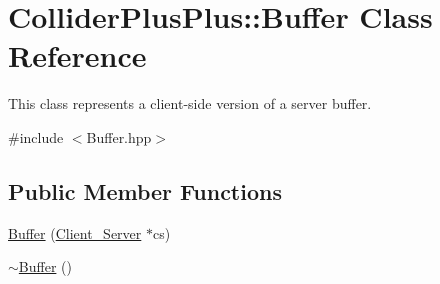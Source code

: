 \hypertarget{classColliderPlusPlus_1_1Buffer}{\section{Collider\-Plus\-Plus\-:\-:Buffer Class Reference}
\label{classColliderPlusPlus_1_1Buffer}
}


This class represents a client-\/side version of a server buffer.  




{\ttfamily \#include $<$Buffer.\-hpp$>$}

\subsection*{Public Member Functions}
\begin{DoxyCompactItemize}
\item 
\hyperlink{classColliderPlusPlus_1_1Buffer_a0455de2dafbd2882de067556f7e1497d}{Buffer} (\hyperlink{classColliderPlusPlus_1_1Client__Server}{Client\-\_\-\-Server} $\ast$cs)
\item 
\hypertarget{classColliderPlusPlus_1_1Buffer_a62178f1cb35c5654c0b16d78526de7e8}{\hyperlink{classColliderPlusPlus_1_1Buffer_a62178f1cb35c5654c0b16d78526de7e8}{$\sim$\-Buffer} ()}\label{classColliderPlusPlus_1_1Buffer_a62178f1cb35c5654c0b16d78526de7e8}


\end{DoxyCompactItemize}
